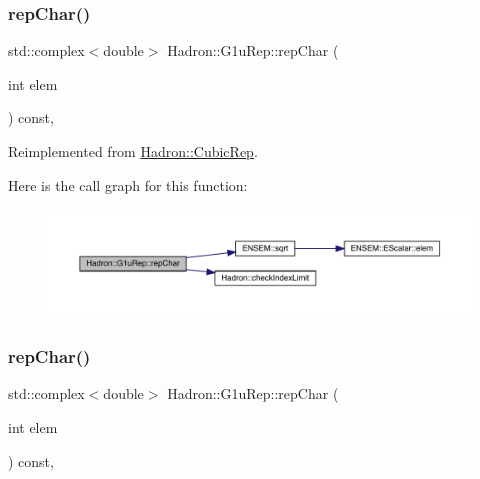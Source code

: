 \subsubsection{\texorpdfstring{repChar()}{repChar()}\hspace{0.1cm}{\footnotesize\ttfamily [2/3]}}
{\footnotesize\ttfamily std\+::complex$<$double$>$ Hadron\+::\+G1u\+Rep\+::rep\+Char (\begin{DoxyParamCaption}\item[{int}]{elem }\end{DoxyParamCaption}) const\hspace{0.3cm}{\ttfamily [inline]}, {\ttfamily [virtual]}}



Reimplemented from \mbox{\hyperlink{structHadron_1_1CubicRep_af45227106e8e715e84b0af69cd3b36f8}{Hadron\+::\+Cubic\+Rep}}.

Here is the call graph for this function\+:
\nopagebreak
\begin{figure}[H]
\begin{center}
\leavevmode
\includegraphics[width=350pt]{d8/d42/structHadron_1_1G1uRep_a3d37407f93af4c955c024aafa0948bcb_cgraph}
\end{center}
\end{figure}
\mbox{\label{structHadron_1_1G1uRep_a3d37407f93af4c955c024aafa0948bcb}} 
\subsubsection{\texorpdfstring{repChar()}{repChar()}\hspace{0.1cm}{\footnotesize\ttfamily [3/3]}}
{\footnotesize\ttfamily std\+::complex$<$double$>$ Hadron\+::\+G1u\+Rep\+::rep\+Char (\begin{DoxyParamCaption}\item[{int}]{elem }\end{DoxyParamCaption}) const\hspace{0.3cm}{\ttfamily [inline]}, {\ttfamily [virtual]}}



